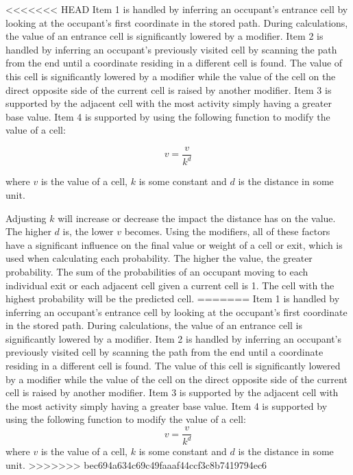 <<<<<<< HEAD
Item 1 is handled by inferring an occupant's entrance cell by looking at the occupant's first coordinate in the stored path. During calculations, the value of an entrance cell is significantly lowered by a modifier. Item 2 is handled by inferring an occupant's previously visited cell by scanning the path from the end until a coordinate residing in a different cell is found. The value of this cell is significantly lowered by a modifier while the value of the cell on the direct opposite side of the current cell is raised by another modifier. Item 3 is supported by the adjacent cell with the most activity simply having a greater base value. Item 4 is supported by using the following function to modify the value of a cell:
 
\begin{equation}
	v = \frac{v}{k^d}
\end{equation}

where \(v\) is the value of a cell, \(k\) is some constant and \(d\) is the distance in some unit.
 
Adjusting \(k\) will increase or decrease the impact the distance has on the value. The higher \(d\) is, the lower \(v\) becomes. Using the modifiers, all of these factors have a significant influence on the final value or weight of a cell or exit, which is used when calculating each probability. The higher the value, the greater probability. The sum of the probabilities of an occupant moving to each individual exit or each adjacent cell given a current cell is 1. The cell with the highest probability will be the predicted cell.
=======
Item 1 is handled by inferring an occupant's entrance cell by looking at the occupant's first coordinate in the stored path. During calculations, the value of an entrance cell is significantly lowered by a modifier. Item 2 is handled by inferring an occupant's previously visited cell by scanning the path from the end until a coordinate residing in a different cell is found. The value of this cell is significantly lowered by a modifier while the value of the cell on the direct opposite side of the current cell is raised by another modifier. Item 3 is supported by the adjacent cell with the most activity simply having a greater base value. Item 4 is supported by using the following function to modify the value of a cell: 
\begin{equation}
v = \frac{v}{k^d}
\end{equation}
where \(v\) is the value of a cell, \(k\) is some constant and \(d\) is the distance in some unit. 
>>>>>>> bec694a634c69c49faaaf44ccf3c8b7419794ec6

